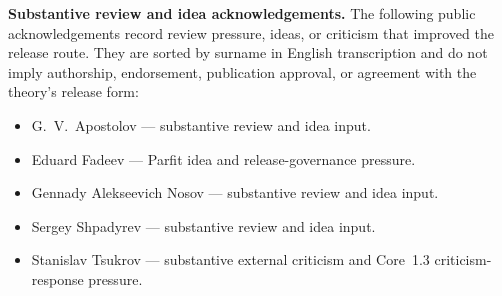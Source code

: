 \clearpage



\noindent\textbf{Substantive review and idea acknowledgements.}
The following public acknowledgements record review pressure, ideas, or criticism
that improved the release route. They are sorted by surname in English
transcription and do not imply authorship, endorsement, publication approval, or
agreement with the theory's release form:
\begin{itemize}
    \item G.~V.~Apostolov --- substantive review and idea input.
    \item Eduard Fadeev --- Parfit idea and release-governance pressure.
    \item Gennady Alekseevich Nosov --- substantive review and idea input.
    \item Sergey Shpadyrev --- substantive review and idea input.
    \item Stanislav Tsukrov --- substantive external criticism and Core~1.3 criticism-response pressure.
\end{itemize}
